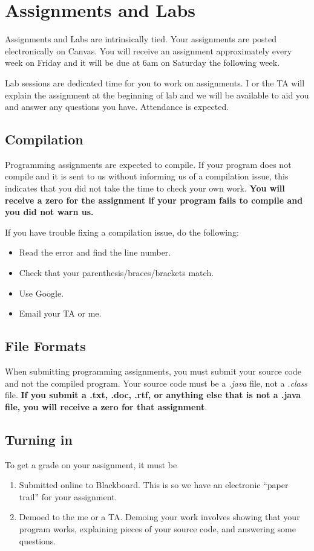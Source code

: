 \documentclass[10pt, letter]{article}
\begin{document}
\section{Assignments and Labs}
Assignments and Labs are intrinsically tied.
Your assignments are posted electronically on Canvas.
You will receive an assignment approximately every week on Friday and it will be due at 6am on Saturday the following week.

Lab sessions are dedicated time for you to work on assignments.
I or the TA will explain the assignment at the beginning of lab and we will be available to aid you and answer any questions you have.
Attendance is expected.


\subsection*{Compilation}
Programming assignments are expected to compile.  
If your program does not compile and it is sent to us without informing us of a compilation issue, this indicates that you did not take the time to check your own work.  
\textbf{You will receive a zero for the assignment if your program fails to compile and you did not warn us.}

If you have trouble fixing a compilation issue, do the following:
{\footnotesize
	\begin{itemize}
		\item Read the error and find the line number.
		\item Check that your parenthesis/braces/brackets match.
		\item Use Google.
		\item Email your TA or me.
	\end{itemize}
}
\subsection*{File Formats}
When submitting programming assignments, you must submit your source code and not the compiled program.
Your source code must be a \emph{.java} file, not a \emph{.class} file.
\textbf{If you submit a .txt, .doc, .rtf, or anything else that is not a .java file, you will receive a zero for that assignment}.




\subsection*{Turning in}
To get a grade on your assignment, it must be 
\begin{enumerate}
	\item Submitted online to Blackboard.  This is so we have an electronic ``paper trail'' for your assignment.
	\item Demoed to the me or a TA.  Demoing your work involves showing that your program works, explaining pieces of your source code, and answering some questions.
\end{enumerate}
\end{document}
